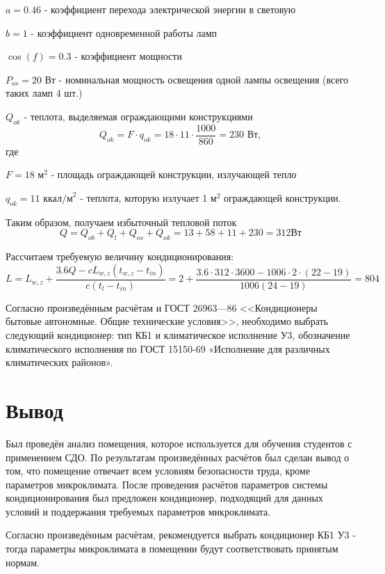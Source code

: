 $a = 0.46$ - коэффициент перехода электрической энергии в световую

$b = 1$ -  коэффициент одновременной работы ламп

$\cos(f) = 0.3$ - коэффициент мощности

$P_{os} = 20 \mbox{ Вт}$ -  номинальная мощность освещения одной лампы освещения
(всего таких ламп 4 шт.)

$Q_{ok}$ - теплота, выделяемая ограждающими конструкциями
$$
Q_{ok} = F\cdot q_{ok} = 18 \cdot 11 \cdot \frac{1000}{860} = 230 \mbox{ Вт},
$$
где

$F = 18 \mbox{ м}^2$  - площадь ограждающей конструкции, излучающей тепло

$q_{ok} = 11 \mbox{ ккал/м}^2$ -  теплота, которую излучает 1 м$^2$ ограждающей кон\-струкции.

Таким образом, получаем избыточный тепловой поток
$$
Q = Q_{ob} + Q_{l} + Q_{os} + Q_{ok}= 13 + 58 + 11 + 230 = 312 \mbox{Вт}
$$

Рассчитаем требуемую величину кондиционирования:
{\small
$$
L = L_{w,z} + \frac{3.6Q - cL_{w,z}(t_{w,z} - t_{in})}{c(t_{l}-t_{in})} = 2 + \frac{3.6\cdot312\cdot3600 - 1006\cdot2\cdot(22-19)}{1006(24-19)} = 804
$$
}

Согласно произведённым расчётам и ГОСТ 26963—86 <<Кондиционеры бытовые авто\-номные. Общие технические условия>>, необходимо выбрать сле\-дующий кондиционер: тип КБ1 и климатическое исполнение У3, обозначение климатического исполнения по ГОСТ 15150-69 «Исполнение для различных климатических районов».

\section{Вывод}

Был проведён анализ помещения, которое используется для обучения сту\-дентов с применением СДО. По результатам произведённых расчётов был сделан вывод о том, что помещение отвечает всем условиям безопасности труда, кроме параметров микроклимата. После проведения расчётов парамет\-ров системы кондиционирования был предложен кондиционер, подходящий для данных условий и поддержания требуемых параметров микроклимата.

Согласно произведённым расчётам, рекомендуется выбрать кондиционер КБ1 У3 - тогда параметры микроклимата в помещении будут соответствовать принятым нормам.


 
